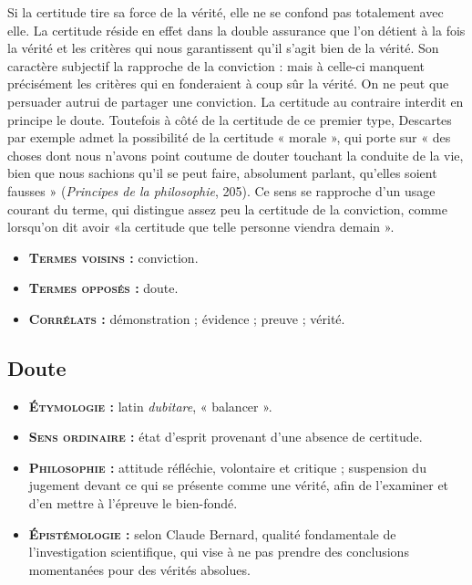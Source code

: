 Si la certitude tire sa force de la vérité,
elle ne se confond pas totalement avec
elle. La certitude réside en effet dans la
double assurance que l’on détient à la fois
la vérité et les critères qui nous garantissent
qu'il s’agit bien de la vérité. Son
caractère subjectif la rapproche de la
conviction : mais à celle-ci manquent
précisément les critères qui en fonderaient
à coup sûr la vérité. On ne peut
que persuader autrui de partager une
conviction. La certitude au contraire interdit
en principe le doute. Toutefois à côté
de la certitude de ce premier type, Descartes
par exemple admet la possibilité
de la certitude « morale », qui porte sur
« des choses dont nous n'avons point
coutume de douter touchant la conduite
de la vie, bien que nous sachions qu'il se
peut faire, absolument parlant, qu'elles
soient fausses » ({\it Principes de la
philosophie}, 205). Ce sens se rapproche d'un
usage courant du terme, qui distingue
assez peu la certitude de la conviction,
comme lorsqu'on dit avoir «la certitude
que telle personne viendra demain ».

{\footnotesize
\begin{itemize}[leftmargin=1cm, label=, itemsep=1pt]
\item {\bf \textsc{Termes voisins} :} conviction.
\item {\bf \textsc{Termes opposés} :} doute.
\item {\bf \textsc{Corrélats} :} démonstration ;
évidence ; preuve ; vérité.
\end{itemize}
}


\subsection{Doute}

{\footnotesize
\begin{itemize}[leftmargin=1cm, label=, itemsep=1pt]
\item {\bf \textsc{Étymologie} :} latin {\it dubitare},
« balancer ».
\item {\bf \textsc{Sens ordinaire} :} état
d’esprit provenant d’une absence de certitude.
\item {\bf \textsc{Philosophie} :} attitude
réfléchie, volontaire et critique ; suspension
du jugement devant ce qui
se présente comme une vérité, afin
de l'examiner et d'en mettre à
l'épreuve le bien-fondé.
\item {\bf \textsc{Épistémologie} :} selon Claude Bernard,
qualité fondamentale de l’investigation
scientifique, qui vise à ne pas
prendre des conclusions momentanées
pour des vérités absolues.
\end{itemize}
}

